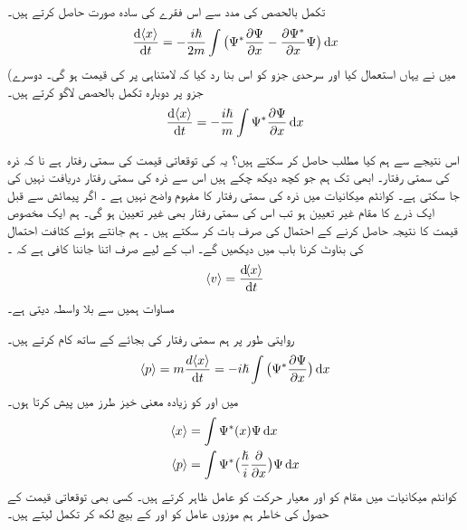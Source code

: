 تکمل بالحصص  کی مدد سے اس فقرے کی سادہ  صورت حاصل کرتے ہیں۔
\begin{align}
\frac{\dif\, \langle x \rangle}{\dif{t}}=-\frac{i\hslash}{2m}\int\big (\Psi^*\frac{\partial{\Psi}}{\partial{x}}-\frac{\partial{\Psi^*}}{\partial{x}}\Psi \big)\dif{x}
\end{align}
(میں نے یہاں  استعمال کیا اور سرحدی جزو کو اس بنا رد کیا کہ  لامتناہی پر  کی قیمت   ہو گی۔ دوسرے جزو پر  دوبارہ تکمل بالحصص لاگو کرتے ہیں۔
\begin{align}\label{مساوات_تفاعل_موج_توقعاتی_قیمت_رفتار}
\frac{\dif \,\langle x \rangle}{\dif{t}}=-\frac{i\hslash}{m}\int\Psi^*\frac{\partial{\Psi}}{\partial{x}} \dif{x}
\end{align}

اس نتیجے سے ہم کیا مطلب حاصل کر سکتے ہیں؟ یہ   کی توقعاتی قیمت کی سمتی رفتار ہے نا کہ  ذرہ کی سمتی رفتار۔  ابھی تک ہم جو کچھ دیکھ چکے ہیں اس سے ذرہ  کی سمتی رفتار دریافت نہیں کی جا سکتی ہے۔ کوانٹم میکانیات میں ذرہ  کی  سمتی رفتار کا مفہوم واضح  نہیں ہے ۔ اگر پیمائش سے قبل ایک ذرے کا مقام  غیر تعیین  ہو تب اس کی سمتی رفتار بھی غیر تعیین ہو گی۔ ہم ایک مخصوص قیمت کا نتیجہ حاصل کرنے کے احتمال کی صرف بات کر سکتے ہیں ۔ ہم  جانتے ہوئے کثافت احتمال کی بناوٹ کرنا باب  میں دیکھیں گے۔ اب کے لیے صرف اتنا جاننا کافی ہے کہ  ۔
\begin{align}\label{مساوات_تفاعل_موج_تعریف_رفتار}
\langle v \rangle=\frac{\dif\langle x \rangle}{\dif{t}}
\end{align}
مساوات  ہمیں  سے بلا واسطہ  دیتی ہے۔ 

روایتی طور پر ہم سمتی رفتار کی بجائے    کے ساتھ کام کرتے ہیں۔
\begin{align}\label{مساوات_تفاعل_موج_تعریف_معیار_حرکت}
\langle p \rangle=m\frac{d\langle x \rangle}{\dif{t}}=-i\hslash\int\big (\Psi^*\frac{\partial{\Psi}}{\partial{x}} \big)\dif{x}
\end{align}
میں  اور  کو زیادہ معنی خیز طرز میں پیش کرتا ہوں۔
\begin{align}
\langle x \rangle &=\int \Psi^*(x)\Psi \dif{x}\label{مساوات_تفاعل_موج_توقعاتی_مقام}\\
\langle p \rangle&=\int \Psi^*\big (\frac{\hslash}{i}\frac{\partial}{\partial{x}}\big )\Psi \dif{x}\label{مساوات_تفاعل_موج_توقعاتی_معیار_حرکت}
\end{align}
کوانٹم میکانیات میں  مقام کو   اور معیار حرکت کو عامل   ظاہر کرتے ہیں۔  کسی بھی توقعاتی قیمت کے حصول کی خاطر ہم موزوں عامل کو  اور  کے بیچ لکھ کر تکمل لیتے ہیں۔

